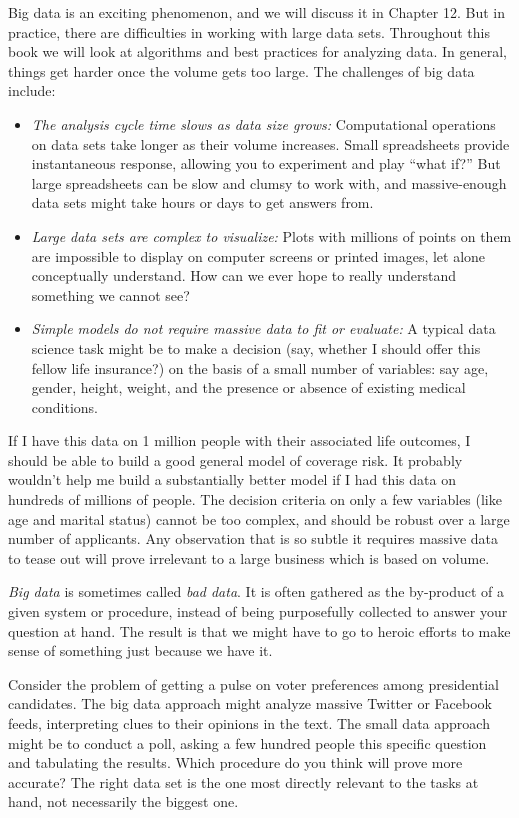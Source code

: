 \documentclass[10pt]{article}
\begin{document}
Big data is an exciting phenomenon, and we will discuss it in Chapter 12. But in practice, there are difficulties in working with large data sets. Throughout this book we will look at algorithms and best practices for analyzing data. In general, things get harder once the volume gets too large. The challenges of big data include:

\begin{itemize}
  \item \emph{The analysis cycle time slows as data size grows:} Computational operations on data sets take longer as their volume increases. Small spreadsheets provide instantaneous response, allowing you to experiment and play ``what if?'' But large spreadsheets can be slow and clumsy to work with, and massive-enough data sets might take hours or days to get answers from.
  \item \emph{Large data sets are complex to visualize:} Plots with millions of points on them are impossible to display on computer screens or printed images, let alone conceptually understand. How can we ever hope to really understand something we cannot see?
  \item \emph{Simple models do not require massive data to fit or evaluate:} A typical data science task might be to make a decision (say, whether I should offer this fellow life insurance?) on the basis of a small number of variables: say age, gender, height, weight, and the presence or absence of existing medical conditions.
\end{itemize}

If I have this data on 1 million people with their associated life outcomes, I should be able to build a good general model of coverage risk. It probably wouldn't help me build a substantially better model if I had this data on hundreds of millions of people. The decision criteria on only a few variables (like age and marital status) cannot be too complex, and should be robust over a large number of applicants. Any observation that is so subtle it requires massive data to tease out will prove irrelevant to a large business which is based on volume.

\emph{Big data} is sometimes called \emph{bad data}. It is often gathered as the by-product of a given system or procedure, instead of being purposefully collected to answer your question at hand. The result is that we might have to go to heroic efforts to make sense of something just because we have it.

Consider the problem of getting a pulse on voter preferences among presidential candidates. The big data approach might analyze massive Twitter or Facebook feeds, interpreting clues to their opinions in the text. The small data approach might be to conduct a poll, asking a few hundred people this specific question and tabulating the results. Which procedure do you think will prove more accurate? The right data set is the one most directly relevant to the tasks at hand, not necessarily the biggest one.
\end{document}
